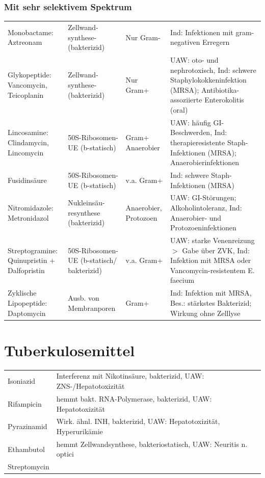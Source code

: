 \documentclass[10pt,a4paper]{report}
\begin{document}
\subsubsection{Mit sehr selektivem Spektrum} %
\label{ssub:mit_sehr_selektivem_spektrum}
\begin{tabularx}{\textwidth}{XXXX}
Monobactame: Aztreonam&Zellwand-synthese-(bakterizid)&Nur Gram-&Ind: Infektionen mit gram-negativen Erregern\\
Glykopeptide: Vancomycin, Teicoplanin&Zellwand-synthese-(bakterizid)&Nur Gram+&UAW: oto- und nephrotoxisch, Ind: schwere Staphylokokkeninfektion (MRSA); Antibiotika-assoziierte Enterokolitis (oral)\\
Lincosamine: Clindamycin, Lincomycin&50S-Ribosomen-UE (b-statisch)&Gram+ Anaerobier&UAW: häufig GI-Beschwerden, Ind: therapieresistente Staph-Infektionen (MRSA); Anaerobierinfektionen\\
Fusidinsäure&50S-Ribosomen-UE (b-statisch)&v.a. Gram+&Ind: schwere Staph-Infektionen (MRSA)\\
Nitromidazole: Metronidazol&Nukleinsäu-resynthese (bakterizid)&Anaerobier, Protozoen&UAW: GI-Störungen; Alkoholintoleranz, Ind: Anaerobier- und Protozoeninfektionen\\
Streptogramine: Quinupristin + Dalfopristin&50S-Ribosomen-UE (b-statisch/ bakterizid)&v.a. Gram+&UAW: starke Venenreizung $>$ Gabe über ZVK, Ind: Infektion mit MRSA oder Vancomycin-resistentem E. faecium\\
Zyklische Lipopeptide: Daptomycin&Ausb. von Membranporen&Gram+&Ind: Infektion mit MRSA, Bes.: stärkstes Bakterizid; Wirkung ohne Zelllyse\\
\end{tabularx}
\section{Tuberkulosemittel} %
\label{sec:tuberkulosemittel}
\begin{tabularx}{\textwidth}{lX}
Isoniazid&Interferenz mit Nikotinsäure, bakterizid, UAW: ZNS-/Hepatotoxizität\\
Rifampicin&hemmt bakt. RNA-Polymerase, bakterizid, UAW: Hepatotoxizität\\
Pyrazinamid&Wirk. ähnl. INH, bakterizid, UAW: Hepatotoxizität, Hyperurikämie\\
Ethambutol&hemmt Zellwandsynthese, bakteriostatisch, UAW: Neuritis n. optici\\
Streptomycin&\\
\end{tabularx}
\end{document}
